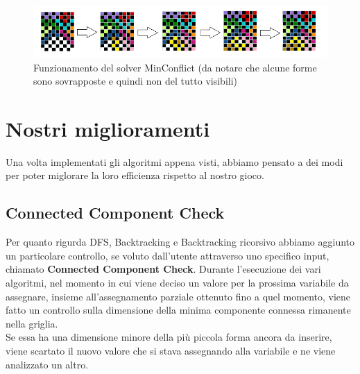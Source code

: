 \begin{figure}[h]
	\centering
	\includegraphics[scale=0.75]{immagini/mc}
	\caption{Funzionamento del solver MinConflict (da notare che alcune forme sono sovrapposte e quindi non del tutto visibili)}
	\label{fig:mc}
\end{figure}


\newpage
\section{Nostri miglioramenti}
\label{migliorie}
Una volta implementati gli algoritmi appena visti, abbiamo pensato a dei modi per poter miglorare la loro efficienza rispetto al nostro gioco. \\

\subsection{Connected Component Check}
Per quanto rigurda DFS, Backtracking e Backtracking ricorsivo abbiamo aggiunto un particolare controllo, se voluto dall'utente attraverso uno specifico input, chiamato \textbf{Connected Component Check}.
Durante l'esecuzione dei vari algoritmi, nel momento in cui viene deciso un valore per la prossima variabile da assegnare, insieme all'assegnamento parziale ottenuto fino a quel momento, viene fatto un controllo sulla dimensione della minima componente connessa rimanente nella griglia. \\
Se essa ha una dimensione minore della più piccola forma ancora da inserire, viene scartato il nuovo valore che si stava assegnando alla variabile e ne viene analizzato un altro. 

